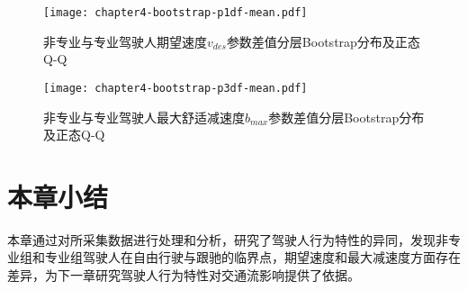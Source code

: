 %

\begin{figure}[htbp]
\begin{center}
\texttt{[image: chapter4-bootstrap-p1df-mean.pdf]}
\end{center}
\caption{非专业与专业驾驶人期望速度$v_{des}$参数差值分层Bootstrap分布及正态Q-Q}
\label{p1-df-qq}
\end{figure}





%

\begin{figure}[htbp]
\begin{center}
\texttt{[image: chapter4-bootstrap-p3df-mean.pdf]}
\end{center}
\caption{非专业与专业驾驶人最大舒适减速度$b_{max}$参数差值分层Bootstrap分布及正态Q-Q}
\label{p3-df-qq}
\end{figure}








%




\section{本章小结}
本章通过对所采集数据进行处理和分析，研究了驾驶人行为特性的异同，发现非专业组和专业组驾驶人在自由行驶与跟驰的临界点，期望速度和最大减速度方面存在差异，为下一章研究驾驶人行为特性对交通流影响提供了依据。
